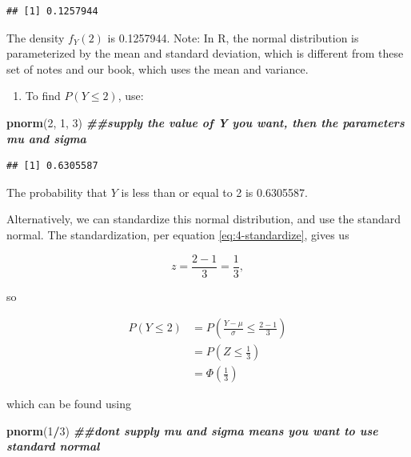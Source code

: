 \documentclass[
]{book}
\newenvironment{Shaded}{\begin{snugshade}}{\end{snugshade}}
\newcommand{\DecValTok}[1]{\textcolor[rgb]{0.00,0.00,0.81}{#1}}
\newcommand{\DocumentationTok}[1]{\textcolor[rgb]{0.56,0.35,0.01}{\textbf{\textit{#1}}}}
\newcommand{\FunctionTok}[1]{\textcolor[rgb]{0.13,0.29,0.53}{\textbf{#1}}}
\newcommand{\NormalTok}[1]{#1}
\newcommand{\SpecialCharTok}[1]{\textcolor[rgb]{0.81,0.36,0.00}{\textbf{#1}}}
\providecommand{\tightlist}{%
  \setlength{\itemsep}{0pt}\setlength{\parskip}{0pt}}
\begin{document}
\begin{verbatim}
## [1] 0.1257944
\end{verbatim}

The density \(f_Y(2)\) is 0.1257944. Note: In R, the normal distribution is parameterized by the mean and standard deviation, which is different from these set of notes and our book, which uses the mean and variance.

\begin{enumerate}
\def\labelenumi{\arabic{enumi}.}
\setcounter{enumi}{1}
\tightlist
\item
  To find \(P(Y \leq 2)\), use:
\end{enumerate}

\begin{Shaded}
\begin{Highlighting}[]
\FunctionTok{pnorm}\NormalTok{(}\DecValTok{2}\NormalTok{, }\DecValTok{1}\NormalTok{, }\DecValTok{3}\NormalTok{) }\DocumentationTok{\#\#supply the value of Y you want, then the parameters mu and sigma}
\end{Highlighting}
\end{Shaded}

\begin{verbatim}
## [1] 0.6305587
\end{verbatim}

The probability that \(Y\) is less than or equal to 2 is 0.6305587.

Alternatively, we can standardize this normal distribution, and use the standard normal. The standardization, per equation \eqref{eq:4-standardize}, gives us

\[
z = \frac{2-1}{3} = \frac{1}{3},
\]

so

\[
\begin{split}
P(Y \leq 2) &= P(\frac{Y-\mu}{\sigma} \leq \frac{2-1}{3}) \\
            &= P(Z \leq \frac{1}{3}) \\
            &= \Phi(\frac{1}{3})
\end{split}
\]

which can be found using

\begin{Shaded}
\begin{Highlighting}[]
\FunctionTok{pnorm}\NormalTok{(}\DecValTok{1}\SpecialCharTok{/}\DecValTok{3}\NormalTok{) }\DocumentationTok{\#\#don\textquotesingle{}t supply mu and sigma means you want to use standard normal}
\end{Highlighting}
\end{Shaded}
\end{document}
